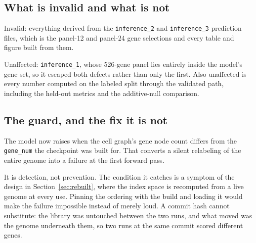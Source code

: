 \subsection{What is invalid and what is not}

Invalid: everything derived from the \texttt{inference\_2} and
\texttt{inference\_3} prediction files, which is the panel-12 and panel-24 gene
selections and every table and figure built from them.

Unaffected: \texttt{inference\_1}, whose 526-gene panel lies entirely inside the
model's gene set, so it escaped both defects rather than only the first. Also
unaffected is every number computed on the labeled split through the validated
path, including the held-out metrics and the additive-null comparison.

\subsection{The guard, and the fix it is not}
\label{sec:guard}

The model now raises when the cell graph's gene node count differs from the
\texttt{gene\_num} the checkpoint was built for. That converts a silent
relabeling of the entire genome into a failure at the first forward pass.

It is detection, not prevention. The condition it catches is a symptom of the
design in Section~\ref{sec:rebuilt}, where the index space is recomputed from a
live genome at every use. Pinning the ordering with the build and loading it
would make the failure impossible instead of merely loud. A commit hash cannot
substitute: the library was untouched between the two runs, and what moved was
the genome underneath them, so two runs at the same commit scored different
genes.
